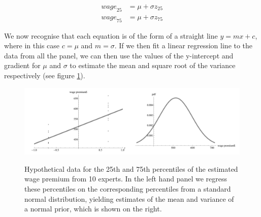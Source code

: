 \documentclass[11pt,fullpage]{book}
\begin{document}
\begin{equation}\label{eq:Prior_elicitingPriorNormalRegression}
\begin{align}
{wage}_{25} &= \mu + \sigma z_{25}\\
{wage}_{75} &= \mu + \sigma z_{75}
\end{align}
\end{equation}

We now recognise that each equation is of the form of a straight line $y = mx + c$, where in this case $c=\mu$ and $m=\sigma$. If we then fit a linear regression line to the data from all the panel, we can then use the values of the y-intercept and gradient for $\mu$ and $\sigma$ to estimate the mean and square root of the variance respectively (see figure \ref{fig:Prior_elicitingRegression}).

\begin{figure}
\centering
\scalebox{0.30} 
{\includegraphics{Prior_elicitingRegression.pdf}}\caption{Hypothetical data for the 25th and 75th percentiles of the estimated wage premium from 10 experts. In the left hand panel we regress these percentiles on the corresponding percentiles from a standard normal distribution, yielding estimates of the mean and variance of a normal prior, which is shown on the right.}\label{fig:Prior_elicitingRegression}
\end{figure}
\end{document}
